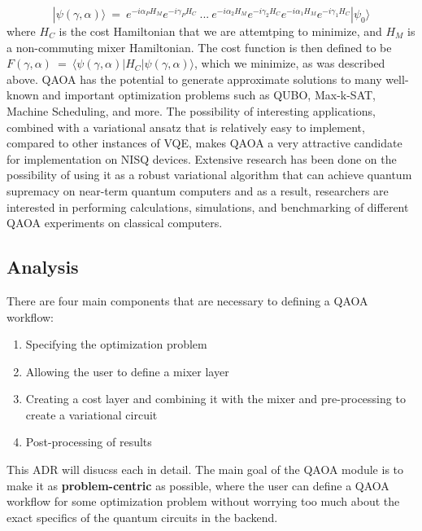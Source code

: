 \documentclass{article}
\begin{document}
$$|\psi(\gamma, \alpha)\rangle \ = \ e^{-i \alpha_P H_M} e^{-i \gamma_P H_C} \ ... \  e^{-i \alpha_2 H_M} e^{-i \gamma_2 H_C}  e^{-i \alpha_1 H_M} e^{-i \gamma_1 H_C} |\psi_0\rangle$$
\noindent
where $H_C$ is the cost Hamiltonian that we are attemtping to minimize, and $H_M$ is a non-commuting mixer Hamiltonian.
\newline\newline
\noindent
The cost function is then defined to be $F(\gamma, \alpha) \ = \ \langle \psi(\gamma, \alpha) | H_C | \psi (\gamma, \alpha) \rangle$, which 
we minimize, as was described above.
\newline\newline
\noindent
QAOA has the potential to generate approximate solutions to many well-known and important optimization problems 
such as QUBO, Max-k-SAT, Machine Scheduling, and more. The possibility of interesting applications, combined 
with a variational ansatz that is relatively easy to implement, compared to other instances of VQE, makes QAOA 
a very attractive candidate for implementation on NISQ devices. Extensive research 
has been done on the possibility of using it as a robust variational algorithm that can 
achieve quantum supremacy on near-term quantum computers and as 
a result, researchers are interested in performing calculations, simulations, and benchmarking of different 
QAOA experiments on classical computers.


\subsection{Analysis}

There are four main components that are necessary to defining a QAOA workflow:

\begin{enumerate}
	\item Specifying the optimization problem
	\item Allowing the user to define a mixer layer
	\item Creating a cost layer and combining it with the mixer and pre-processing 
	      to create a variational circuit
      	\item Post-processing of results 
\end{enumerate}
\noindent
This ADR will disucss each in detail.
\newline\newline
The main goal of the QAOA module is to make it as \textbf{problem-centric} as possible, 
where the user can define a QAOA workflow for some optimization problem without 
worrying too much about the exact specifics of the quantum circuits in the backend.
\end{document}
